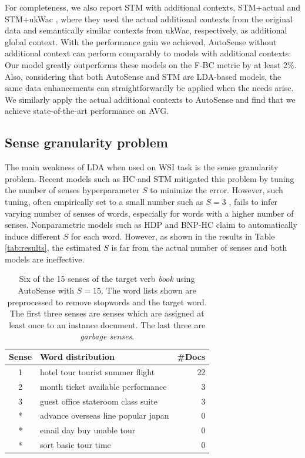 \documentclass[letterpaper]{article} %
\begin{document}
For completeness, we also report STM with additional contexts, STM+actual and STM+ukWac \cite{wang2015sense}, where they used the actual additional contexts from the original data and semantically similar contexts from ukWac, respectively, as additional global context. With the performance gain we achieved, AutoSense without additional context can perform comparably to models with additional contexts: Our model greatly outperforms these models on the F-BC metric by at least 2\%. Also, considering that both AutoSense and STM are LDA-based models, the same data enhancements can straightforwardly be applied when the needs arise. We similarly apply the actual additional contexts to AutoSense and find that we achieve state-of-the-art performance on \textsc{AVG}.

\subsection{Sense granularity problem} %
\label{sec:sensegran}

The main weakness of LDA when used on WSI task is the sense granularity problem. Recent models such as HC \cite{chang2014inducing} and STM \cite{wang2015sense} mitigated this problem by tuning the number of senses hyperparameter $S$ to minimize the error. However, such tuning, often empirically set to a small number such as $S=3$ \cite{wang2015sense}, fails to infer varying number of senses of words, especially for words with a higher number of senses. Nonparametric models such as HDP and BNP-HC \cite{lau2013unimelb,chang2014inducing} claim to automatically induce different $S$ for each word. However, as shown in the results in Table \ref{tab:results}, the estimated $S$ is far from the actual number of senses and both models are ineffective.

\begin{table}[!t]
	\centering
	\begin{tabular}{|c|l|r|}
		\hline
		Sense & Word distribution & \#Docs \\ \hline
		1 & hotel tour tourist summer flight & 22 \\ \hline
		2 & month ticket available performance & 3 \\ \hline
		3 & guest office stateroom class suite & 3 \\ \hline
		* & advance overseas line popular japan & 0 \\ \hline
		* & email day buy unable tour & 0 \\ \hline
		* & sort basic tour time & 0 \\ \hline
	\end{tabular}
	\caption{Six of the 15 senses of the target verb \textit{book} using AutoSense with $S=15$.
		The word lists shown are preprocessed to remove stopwords and the target word.
		The first three senses are senses which are assigned at least once to an instance document. The last three are \textit{garbage senses}.}
	\label{tab:sample}
\end{table}
\label{sec:senses}
\end{document}
